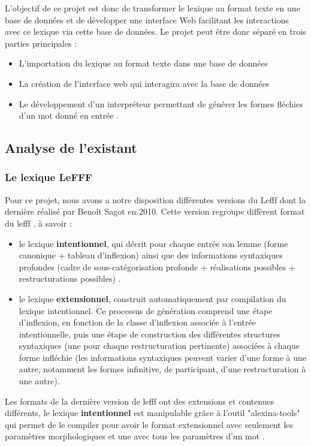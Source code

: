 \documentclass[12pt,a4paper]{article}
\begin{document}
L'objectif de ce projet est donc de transformer le lexique au format texte en une base de données et de développer une interface Web facilitant les interactions avec ce lexique via cette base de données.
Le projet peut être donc séparé en trois parties principales : 
\begin{itemize}
    \item L'importation du lexique au format texte dans une base de données
    \item La création de l'interface web qui interagira avec la base de données
    \item Le développement d'un interpréteur permettant de générer les formes fléchies d'un mot donné en entrée .
\end{itemize}
\subsection{Analyse de l'existant}
\subsubsection{Le lexique LeFFF }
Pour ce projet, nous avons a notre  disposition différentes versions  du Lefff  dont la dernière réalisé par Benoît Sagot en 2010. Cette version regroupe diffèrent format du lefff , à savoir \cite{lefff_int} :
\begin{itemize}
\item le lexique \textbf{intentionnel}, qui décrit pour chaque entrée son lemme (forme canonique + tableau d'inflexion) ainsi que des informations syntaxiques profondes (cadre de sous-catégorisation profonde + réalisations possibles + restructurations possibles) .
\item le lexique \textbf{extensionnel}, construit automatiquement par compilation du lexique intentionnel. Ce processus de génération comprend une étape d'inflexion, en fonction de la classe d'inflexion associée à l'entrée intentionnelle, puis une étape de construction des différentes structures syntaxiques (une pour chaque restructuration pertinente) associées à chaque forme infléchie (les informations syntaxiques peuvent varier d'une forme à une autre, notamment les formes infinitive, de participant, d'une restructuration à une autre).
\end{itemize} 

\smallbreak Les formats de la dernière version de lefff ont des extensions et contenues différents, le lexique \textbf{intentionnel} est manipulable grâce à l'outil "alexina-tools" qui permet de le compiler pour avoir le format extensionnel avec seulement les paramètres morphologiques et une avec tous les paramètres d'un mot .
\end{document}
